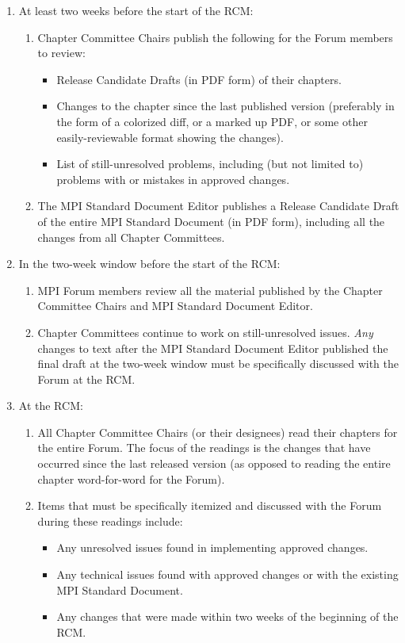 {{\begin{enumerate}
\item At least two weeks before the start of the RCM:
  \begin{enumerate}
  \item Chapter Committee Chairs publish the following for the Forum
    members to review:
    \begin{itemize}
      \item Release Candidate Drafts (in PDF form) of their chapters.
      \item Changes to the chapter since the last published version
        (preferably in the form of a colorized diff, or a marked up
        PDF, or some other easily-reviewable format showing the
        changes).
      \item List of still-unresolved problems, including (but not
        limited to) problems with or mistakes in approved changes.
    \end{itemize}
  \item The MPI Standard Document Editor publishes a Release Candidate
    Draft of the entire MPI Standard Document (in PDF form), including
    all the changes from all Chapter Committees.
  \end{enumerate}

\item In the two-week window before the start of the RCM:
  \begin{enumerate}
  \item MPI Forum members review all the material published by the
    Chapter Committee Chairs and MPI Standard Document Editor.
  \item Chapter Committees continue to work on still-unresolved
    issues.  {\em Any} changes to text after the MPI Standard Document
    Editor published the final draft at the two-week window must be
    specifically discussed with the Forum at the RCM.
  \end{enumerate}

\item At the RCM:
  \begin{enumerate}
  \item All Chapter Committee Chairs (or their designees) read their
    chapters for the entire Forum.  The focus of the readings is the
    changes that have occurred since the last released version (as
    opposed to reading the entire chapter word-for-word for the
    Forum).
  \item Items that must be specifically itemized and discussed with
    the Forum during these readings include:
    \begin{itemize}
    \item Any unresolved issues found in implementing approved
      changes.
    \item Any technical issues found with approved changes or with the
      existing MPI Standard Document.
    \item Any changes that were made within two weeks of the beginning
      of the RCM.
    \end{itemize}


\end{enumerate}
\end{enumerate}}}
